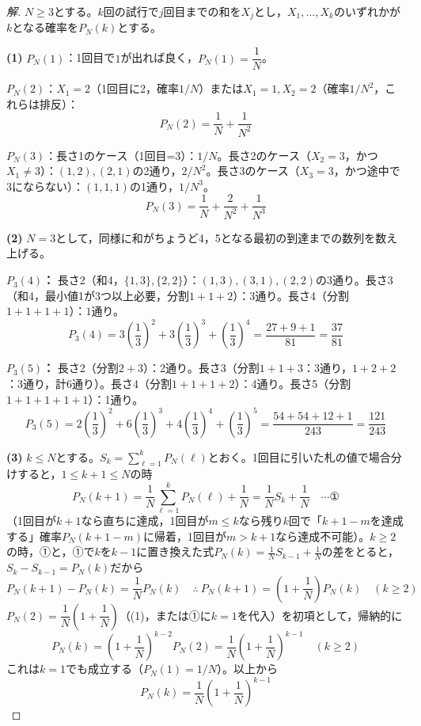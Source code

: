 \documentclass[../main.tex]{subfiles}
\begin{document}
\begin{proof}[解]
  $N\ge3$とする。$k$回の試行で$j$回目までの和を$X_j$とし，$X_1,\dots,X_k$のいずれかが$k$となる確率を$P_N(k)$とする。

  \textbf{(1)} $P_N(1)$：1回目で$1$が出れば良く，$P_N(1)=\dfrac1N$。

  $P_N(2)$：$X_1=2$（1回目に2，確率$1/N$）または$X_1=1,X_2=2$（確率$1/N^2$，これらは排反）：
  \[
    P_N(2)=\frac1N+\frac1{N^2}
  \]

  $P_N(3)$：長さ1のケース（1回目=3）：$1/N$。長さ2のケース（$X_2=3$，かつ$X_1\ne3$）：$(1,2),(2,1)$の2通り，$2/N^2$。長さ3のケース（$X_3=3$，かつ途中で3にならない）：$(1,1,1)$の1通り，$1/N^3$。
  \[
    P_N(3)=\frac1N+\frac2{N^2}+\frac1{N^3}
  \]

  \textbf{(2)} $N=3$として，同様に和がちょうど4，5となる最初の到達までの数列を数え上げる。

  \textbf{$P_3(4)$：} 長さ2（和4，$\{1,3\},\{2,2\}$）：$(1,3),(3,1),(2,2)$の3通り。長さ3（和4，最小値1が3つ以上必要，分割$1+1+2$）：$3$通り。長さ4（分割$1+1+1+1$）：$1$通り。
  \[
    P_3(4)=3\left(\frac13\right)^2+3\left(\frac13\right)^3+\left(\frac13\right)^4=\frac{27+9+1}{81}=\frac{37}{81}
  \]

  \textbf{$P_3(5)$：} 長さ2（分割$2+3$）：2通り。長さ3（分割$1+1+3$：3通り，$1+2+2$：3通り，計6通り）。長さ4（分割$1+1+1+2$）：4通り。長さ5（分割$1+1+1+1+1$）：1通り。
  \[
    P_3(5)=2\left(\frac13\right)^2+6\left(\frac13\right)^3+4\left(\frac13\right)^4+\left(\frac13\right)^5=\frac{54+54+12+1}{243}=\frac{121}{243}
  \]

  \textbf{(3)} $k\le N$とする。$S_k=\displaystyle\sum_{\ell=1}^kP_N(\ell)$とおく。1回目に引いた札の値で場合分けすると，$1\le k+1\le N$の時
  \[
    P_N(k+1)=\frac1N\sum_{\ell=1}^kP_N(\ell)+\frac1N=\frac1NS_k+\frac1N \quad\cdots\text{①}
  \]
  （1回目が$k+1$なら直ちに達成，1回目が$m\le k$なら残り$k$回で「$k+1-m$を達成する」確率$P_N(k+1-m)$に帰着，1回目が$m>k+1$なら達成不可能）。$k\ge2$の時，①と，①で$k$を$k-1$に置き換えた式$P_N(k)=\frac1NS_{k-1}+\frac1N$の差をとると，$S_k-S_{k-1}=P_N(k)$だから
  \[
    P_N(k+1)-P_N(k)=\frac1NP_N(k) \quad\therefore\ P_N(k+1)=\left(1+\frac1N\right)P_N(k) \quad(k\ge2)
  \]
  $P_N(2)=\dfrac1N\left(1+\dfrac1N\right)$（(1)，または①に$k=1$を代入）を初項として，帰納的に
  \[
    P_N(k)=\left(1+\frac1N\right)^{k-2}P_N(2)=\frac1N\left(1+\frac1N\right)^{k-1} \quad(k\ge2)
  \]
  これは$k=1$でも成立する（$P_N(1)=1/N$）。以上から
  \[
    P_N(k)=\frac1N\left(1+\frac1N\right)^{k-1}
  \]
\end{proof}
\end{document}
